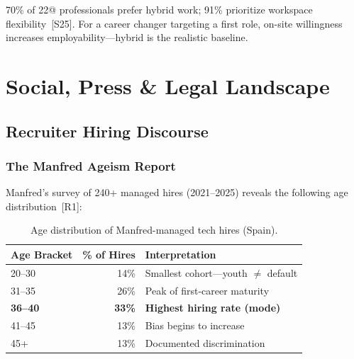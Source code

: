 \documentclass[a4paper,11pt,openany]{report}
\begin{document}
70\% of 22@ professionals prefer hybrid work; 91\% prioritize workspace
flexibility~[S25]. For a career changer targeting a first role, on-site
willingness increases employability---hybrid is the realistic baseline.



\chapter{Social, Press \& Legal Landscape}
\label{ch:social}


\section{Recruiter Hiring Discourse}

\subsection{The Manfred Ageism Report}

Manfred's survey of 240+ managed hires (2021--2025) reveals the following age
distribution~[R1]:

\begin{table}[htbp]
\centering
\caption{Age distribution of Manfred-managed tech hires (Spain).}
\label{tab:manfred-age}
\begin{tabular}{l r l}
\toprule
\textbf{Age Bracket} & \textbf{\% of Hires} & \textbf{Interpretation} \\
\midrule
20--30  & 14\% & Smallest cohort---youth $\neq$ default \\
31--35  & 26\% & Peak of first-career maturity \\
\textbf{36--40}  & \textbf{33\%} & \textbf{Highest hiring rate (mode)} \\
41--45  & 13\% & Bias begins to increase \\
45+     & 13\% & Documented discrimination \\
\bottomrule
\end{tabular}
\end{table}
\end{document}

